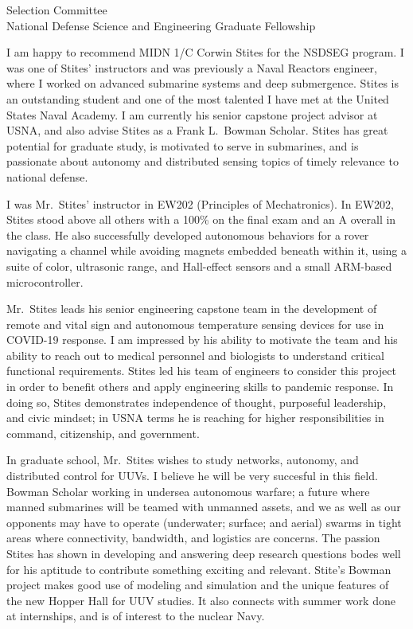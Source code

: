 \documentclass[10pt]{wrceletter}
\date{\today}
\begin{document}
\begin{letter}{%
Selection Committee\\
National Defense Science and Engineering Graduate Fellowship}

\opening{}
\raggedright %
\setlength{\parindent}{15pt} %
I am happy to recommend MIDN 1/C Corwin Stites for the NSDSEG program. I was one of Stites' instructors and was previously a Naval Reactors engineer, where I worked on advanced submarine systems and deep submergence. Stites is an outstanding student and one of the most talented I have met at the United States Naval Academy. I am currently his senior capstone project advisor at USNA, and also advise Stites as a Frank L.~Bowman Scholar.  Stites has great potential for graduate study, is motivated to serve in submarines, and is passionate about autonomy and distributed sensing topics of timely relevance to national defense.  

I was Mr.~Stites' instructor in EW202 (Principles of Mechatronics).  In EW202, Stites stood above all others with a 100\% on the final exam and an A overall in the class. He also successfully developed autonomous behaviors for a rover navigating a channel while avoiding magnets embedded beneath within it, using a suite of color, ultrasonic range, and Hall-effect sensors and a small ARM-based microcontroller. 

Mr.~Stites leads his senior engineering capstone team in the development of remote and vital sign and autonomous temperature sensing devices for use in COVID-19 response. I am impressed by his ability to motivate the team and his ability to reach out to medical personnel and biologists to understand critical functional requirements. Stites led his team of engineers to consider this project in order to benefit others and apply engineering skills to pandemic response. In doing so, Stites demonstrates independence of thought, purposeful leadership, and civic mindset; in USNA terms he is reaching for higher responsibilities in command, citizenship, and government.

In graduate school, Mr.~Stites wishes to study networks, autonomy, and distributed control for UUVs. I believe he will be very succesful in this field. Bowman Scholar working in undersea autonomous warfare; a future where manned submarines will be teamed with unmanned assets, and we as well as our opponents may have to operate (underwater; surface; and aerial) swarms in tight areas where connectivity, bandwidth, and logistics are concerns. The passion Stites has shown in developing and answering deep research questions bodes well for his aptitude to contribute something exciting and relevant. Stite's Bowman project makes good use of modeling and simulation and the unique features of the new Hopper Hall for UUV studies. It also connects with summer work done at internships, and is of interest to the nuclear Navy.  


\end{letter}
\end{document}

